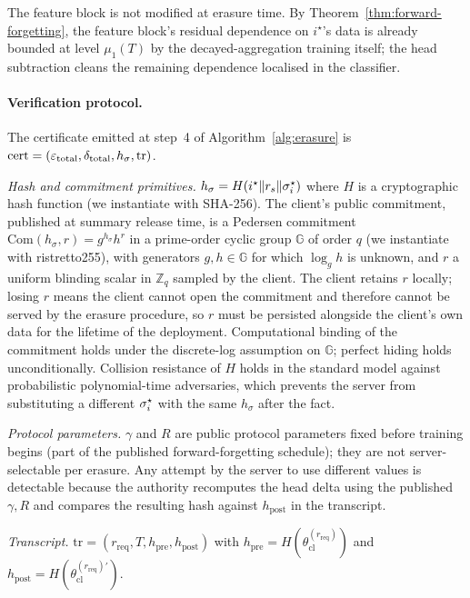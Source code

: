 The feature block is not modified at erasure time. By
Theorem~\ref{thm:forward-forgetting}, the feature block's residual dependence on
$i^\star$'s data is already bounded at level $\mu_1(T)$ by the decayed-aggregation
training itself; the head subtraction cleans the remaining dependence localised in the
classifier.

\paragraph{Verification protocol.}
The certificate emitted at step~4 of Algorithm~\ref{alg:erasure} is
$\mathrm{cert} = (\varepsilon_\mathrm{total}, \delta_\mathrm{total}, h_\sigma, \mathrm{tr})$.

\textit{Hash and commitment primitives.} $h_\sigma = H(i^{\star} \| r_s \|
\sigma_i^{\star})$ where $H$ is a cryptographic hash function (we instantiate with
SHA-256). The client's public commitment, published at summary release time, is a
Pedersen commitment $\mathrm{Com}(h_\sigma, r) = g^{h_\sigma} h^{r}$ in a
prime-order cyclic group $\mathbb{G}$ of order $q$ (we instantiate with
ristretto255), with generators $g, h \in \mathbb{G}$ for which $\log_g h$ is
unknown, and $r$ a uniform blinding scalar in $\mathbb{Z}_q$ sampled by the client.
The client retains $r$ locally; losing $r$ means the client cannot open the
commitment and therefore cannot be served by the erasure procedure, so $r$ must
be persisted alongside the client's own data for the lifetime of the deployment.
Computational binding of the commitment holds under the discrete-log assumption on
$\mathbb{G}$; perfect hiding holds unconditionally. Collision resistance of $H$
holds in the standard model against probabilistic polynomial-time adversaries,
which prevents the server from substituting a different $\sigma_i^{\star}$ with the
same $h_\sigma$ after the fact.

\textit{Protocol parameters.} $\gamma$ and $R$ are public protocol parameters
fixed before training begins (part of the published forward-forgetting schedule);
they are not server-selectable per erasure. Any attempt by the server to use
different values is detectable because the authority recomputes the head delta
using the published $\gamma, R$ and compares the resulting hash against
$h_\mathrm{post}$ in the transcript.

\textit{Transcript.} $\mathrm{tr} = (r_\mathrm{req}, T, h_\mathrm{pre},
h_\mathrm{post})$ with $h_\mathrm{pre} = H(\theta_\mathrm{cl}^{(r_\mathrm{req})})$
and $h_\mathrm{post} = H(\theta_\mathrm{cl}^{(r_\mathrm{req})\prime})$.

